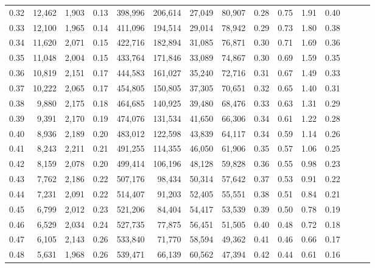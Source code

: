 \begin{tabular}{rrrrrrrrrrrrrrr}
0.32 &  12,462 &  1,903 &  0.13 &  398,996 &  206,614 &   27,049 &   80,907 &  0.28 &  0.75 &  1.91 &      0.40 \\
0.33 &  12,100 &  1,965 &  0.14 &  411,096 &  194,514 &   29,014 &   78,942 &  0.29 &  0.73 &  1.80 &      0.38 \\
0.34 &  11,620 &  2,071 &  0.15 &  422,716 &  182,894 &   31,085 &   76,871 &  0.30 &  0.71 &  1.69 &      0.36 \\
0.35 &  11,048 &  2,004 &  0.15 &  433,764 &  171,846 &   33,089 &   74,867 &  0.30 &  0.69 &  1.59 &      0.35 \\
0.36 &  10,819 &  2,151 &  0.17 &  444,583 &  161,027 &   35,240 &   72,716 &  0.31 &  0.67 &  1.49 &      0.33 \\
0.37 &  10,222 &  2,065 &  0.17 &  454,805 &  150,805 &   37,305 &   70,651 &  0.32 &  0.65 &  1.40 &      0.31 \\
0.38 &   9,880 &  2,175 &  0.18 &  464,685 &  140,925 &   39,480 &   68,476 &  0.33 &  0.63 &  1.31 &      0.29 \\
0.39 &   9,391 &  2,170 &  0.19 &  474,076 &  131,534 &   41,650 &   66,306 &  0.34 &  0.61 &  1.22 &      0.28 \\
0.40 &   8,936 &  2,189 &  0.20 &  483,012 &  122,598 &   43,839 &   64,117 &  0.34 &  0.59 &  1.14 &      0.26 \\
0.41 &   8,243 &  2,211 &  0.21 &  491,255 &  114,355 &   46,050 &   61,906 &  0.35 &  0.57 &  1.06 &      0.25 \\
0.42 &   8,159 &  2,078 &  0.20 &  499,414 &  106,196 &   48,128 &   59,828 &  0.36 &  0.55 &  0.98 &      0.23 \\
0.43 &   7,762 &  2,186 &  0.22 &  507,176 &   98,434 &   50,314 &   57,642 &  0.37 &  0.53 &  0.91 &      0.22 \\
0.44 &   7,231 &  2,091 &  0.22 &  514,407 &   91,203 &   52,405 &   55,551 &  0.38 &  0.51 &  0.84 &      0.21 \\
0.45 &   6,799 &  2,012 &  0.23 &  521,206 &   84,404 &   54,417 &   53,539 &  0.39 &  0.50 &  0.78 &      0.19 \\
0.46 &   6,529 &  2,034 &  0.24 &  527,735 &   77,875 &   56,451 &   51,505 &  0.40 &  0.48 &  0.72 &      0.18 \\
0.47 &   6,105 &  2,143 &  0.26 &  533,840 &   71,770 &   58,594 &   49,362 &  0.41 &  0.46 &  0.66 &      0.17 \\
0.48 &   5,631 &  1,968 &  0.26 &  539,471 &   66,139 &   60,562 &   47,394 &  0.42 &  0.44 &  0.61 &      0.16 \\

\end{tabular}
